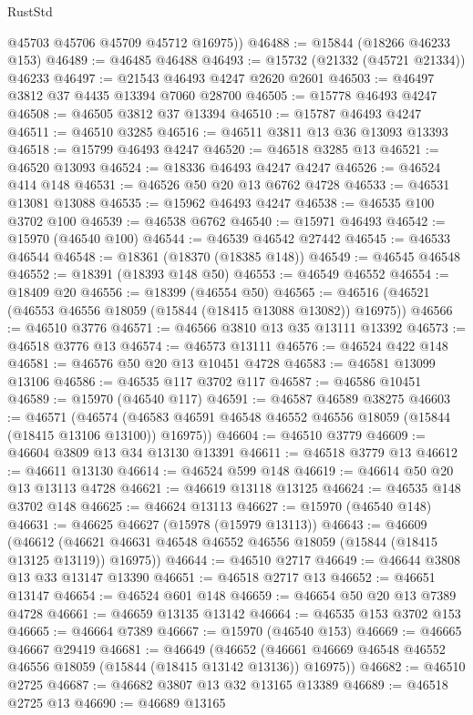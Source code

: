 \begin{lexlean}{RustStd}
\begin{coremodule}
        @45703
        @45706
        @45709
        @45712
        @16975))
@46488 := @15844 (@18266 @46233 @153)
@46489 := @46485 @46488
@46493 := @15732 (@21332 (@45721 @21334)) @46233
@46497 := @21543 @46493 @4247 @2620 @2601
@46503 := @46497 @3812 @37 @4435 @13394 @7060 @28700
@46505 := @15778 @46493 @4247
@46508 := @46505 @3812 @37 @13394
@46510 := @15787 @46493 @4247
@46511 := @46510 @3285
@46516 := @46511 @3811 @13 @36 @13093 @13393
@46518 := @15799 @46493 @4247
@46520 := @46518 @3285 @13
@46521 := @46520 @13093
@46524 := @18336 @46493 @4247 @4247
@46526 := @46524 @414 @148
@46531 := @46526 @50 @20 @13 @6762 @4728
@46533 := @46531 @13081 @13088
@46535 := @15962 @46493 @4247
@46538 := @46535 @100 @3702 @100
@46539 := @46538 @6762
@46540 := @15971 @46493
@46542 := @15970 (@46540 @100)
@46544 := @46539 @46542 @27442
@46545 := @46533 @46544
@46548 := @18361 (@18370 (@18385 @148))
@46549 := @46545 @46548
@46552 := @18391 (@18393 @148 @50)
@46553 := @46549 @46552
@46554 := @18409 @20
@46556 := @18399 (@46554 @50)
@46565 := @46516 (@46521 (@46553 @46556 @18059 (@15844 (@18415 @13088 @13082)) @16975))
@46566 := @46510 @3776
@46571 := @46566 @3810 @13 @35 @13111 @13392
@46573 := @46518 @3776 @13
@46574 := @46573 @13111
@46576 := @46524 @422 @148
@46581 := @46576 @50 @20 @13 @10451 @4728
@46583 := @46581 @13099 @13106
@46586 := @46535 @117 @3702 @117
@46587 := @46586 @10451
@46589 := @15970 (@46540 @117)
@46591 := @46587 @46589 @38275
@46603 := @46571
    (@46574 (@46583 @46591 @46548 @46552 @46556 @18059 (@15844 (@18415 @13106 @13100)) @16975))
@46604 := @46510 @3779
@46609 := @46604 @3809 @13 @34 @13130 @13391
@46611 := @46518 @3779 @13
@46612 := @46611 @13130
@46614 := @46524 @599 @148
@46619 := @46614 @50 @20 @13 @13113 @4728
@46621 := @46619 @13118 @13125
@46624 := @46535 @148 @3702 @148
@46625 := @46624 @13113
@46627 := @15970 (@46540 @148)
@46631 := @46625 @46627 (@15978 (@15979 @13113))
@46643 := @46609
    (@46612 (@46621 @46631 @46548 @46552 @46556 @18059 (@15844 (@18415 @13125 @13119)) @16975))
@46644 := @46510 @2717
@46649 := @46644 @3808 @13 @33 @13147 @13390
@46651 := @46518 @2717 @13
@46652 := @46651 @13147
@46654 := @46524 @601 @148
@46659 := @46654 @50 @20 @13 @7389 @4728
@46661 := @46659 @13135 @13142
@46664 := @46535 @153 @3702 @153
@46665 := @46664 @7389
@46667 := @15970 (@46540 @153)
@46669 := @46665 @46667 @29419
@46681 := @46649
    (@46652 (@46661 @46669 @46548 @46552 @46556 @18059 (@15844 (@18415 @13142 @13136)) @16975))
@46682 := @46510 @2725
@46687 := @46682 @3807 @13 @32 @13165 @13389
@46689 := @46518 @2725 @13
@46690 := @46689 @13165

\end{coremodule}
\end{lexlean}
